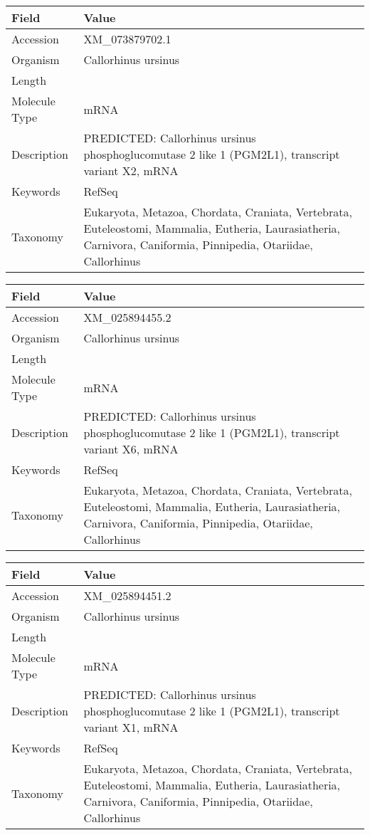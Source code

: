 \documentclass[10pt]{article}
\begin{document}
\vspace{1em}
{\footnotesize
\begin{longtable}{>{\raggedright\arraybackslash}p{4.5cm} >{\raggedright\arraybackslash}p{11.5cm}}
\textbf{Field} & \textbf{Value} \\
\hline
Accession & XM\_073879702.1 \\
Organism & Callorhinus ursinus \\
Length & 2960 \\
Molecule Type & mRNA \\
Description & PREDICTED: Callorhinus ursinus phosphoglucomutase 2 like 1 (PGM2L1), transcript variant X2, mRNA \\
Keywords & RefSeq \\
Taxonomy & Eukaryota, Metazoa, Chordata, Craniata, Vertebrata, Euteleostomi, Mammalia, Eutheria, Laurasiatheria, Carnivora, Caniformia, Pinnipedia, Otariidae, Callorhinus \\
\end{longtable}
}

\vspace{1em}
{\footnotesize
\begin{longtable}{>{\raggedright\arraybackslash}p{4.5cm} >{\raggedright\arraybackslash}p{11.5cm}}
\textbf{Field} & \textbf{Value} \\
\hline
Accession & XM\_025894455.2 \\
Organism & Callorhinus ursinus \\
Length & 2854 \\
Molecule Type & mRNA \\
Description & PREDICTED: Callorhinus ursinus phosphoglucomutase 2 like 1 (PGM2L1), transcript variant X6, mRNA \\
Keywords & RefSeq \\
Taxonomy & Eukaryota, Metazoa, Chordata, Craniata, Vertebrata, Euteleostomi, Mammalia, Eutheria, Laurasiatheria, Carnivora, Caniformia, Pinnipedia, Otariidae, Callorhinus \\
\end{longtable}
}

\vspace{1em}
{\footnotesize
\begin{longtable}{>{\raggedright\arraybackslash}p{4.5cm} >{\raggedright\arraybackslash}p{11.5cm}}
\textbf{Field} & \textbf{Value} \\
\hline
Accession & XM\_025894451.2 \\
Organism & Callorhinus ursinus \\
Length & 2883 \\
Molecule Type & mRNA \\
Description & PREDICTED: Callorhinus ursinus phosphoglucomutase 2 like 1 (PGM2L1), transcript variant X1, mRNA \\
Keywords & RefSeq \\
Taxonomy & Eukaryota, Metazoa, Chordata, Craniata, Vertebrata, Euteleostomi, Mammalia, Eutheria, Laurasiatheria, Carnivora, Caniformia, Pinnipedia, Otariidae, Callorhinus \\
\end{longtable}
}
\end{document}

